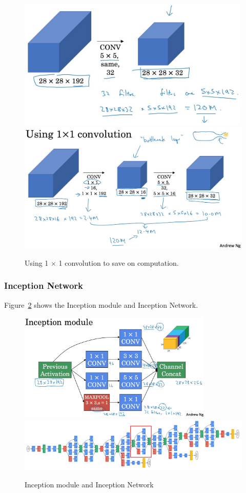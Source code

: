 \documentclass[UTF8]{article}
\begin{document}
\begin{figure}[htb]
    \centering
    \includegraphics[width=30em]{figures/problem-of-computation-cost}
    \includegraphics[width=40em]{figures/using-1-by-1-conv-to-save-computation}
    \caption{Using 1 $\times$ 1 convolution to save on computation.}
    \label{fig:using-1-by-1-conv-to-save-computation}
\end{figure}

\subsubsection{Inception Network}
Figure~\ref{fig:inception-module-and-inception-network} shows the Inception module and Inception
Network.

\begin{figure}[htb]
    \centering
    \includegraphics[width=25em]{figures/inception-module}
    \includegraphics[width=40em]{figures/inception-network}
    \caption{Inception module and Inception Network}
    \label{fig:inception-module-and-inception-network}
\end{figure}
\end{document}
